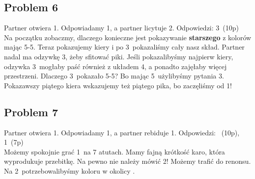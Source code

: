 \documentclass[12pt, a4paper]{article}
\begin{document}
\subsection*{Problem 6}
Partner otwiera 1\diams. Odpowiadamy 1\spades, a partner licytuje 2\nt.
Odpowiedzi: 3\hearts\ (10p) \\
Na początku zobaczmy, dlaczego konieczne jest pokazywanie \textbf{starszego} z kolorów mając 5-5.
Teraz pokazujemy kiery i po 3\hearts\ pokazaliśmy cały nasz skład. Partner nadal ma odzywkę 3\spades,
żeby sfitować piki.
Jeśli pokazalibyśmy najpierw kiery, odzywka 3\spades\ mogłaby paść również z układem 4\hearts, a 
ponadto zajęłaby więcej przestrzeni.
Dlaczego 3\hearts\ pokazało 5-5? Bo mając 5\hearts\ użylibyśmy pytania 3\clubs. Pokazawszy piątego
kiera wskazujemy też piątego pika, bo zaczęliśmy od 1\spades!


\subsection*{Problem 7}
Partner otwiera 1\clubs. Odpowiadamy 1\hearts, a partner rebiduje 1\spades.
Odpowiedzi: \pass\ (10p), 1\nt\ (7p) \\
Możemy spokojnie grać 1\spades\ na 7 atutach. Mamy fajną krótkość karo, która wyprodukuje przebitkę.
Na pewno nie należy mówić 2\hearts! Możemy trafić do renonsu. Na 2\hearts\ potrzebowalibyśmy koloru w okolicy
\hearts {}.
\end{document}
